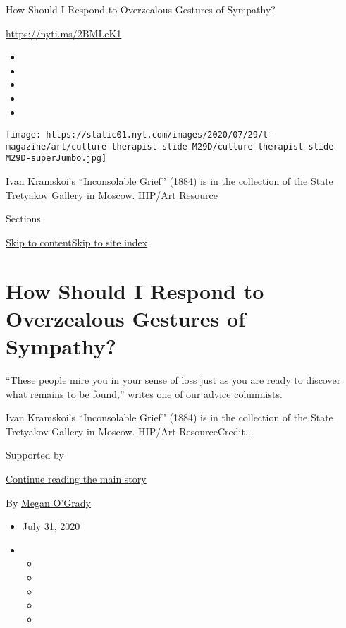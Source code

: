 How Should I Respond to Overzealous Gestures of Sympathy?

\url{https://nyti.ms/2BMLeK1}

\begin{itemize}
\item
\item
\item
\item
\item
\end{itemize}

\texttt{[image: https://static01.nyt.com/images/2020/07/29/t-magazine/art/culture-therapist-slide-M29D/culture-therapist-slide-M29D-superJumbo.jpg]}

Ivan Kramskoi's ``Inconsolable Grief'' (1884) is in the collection of
the State Tretyakov Gallery in Moscow. HIP/Art Resource

Sections

\protect\hyperlink{site-content}{Skip to
content}\protect\hyperlink{site-index}{Skip to site index}

\hypertarget{how-should-i-respond-to-overzealous-gestures-of-sympathy}{%
\section{How Should I Respond to Overzealous Gestures of
Sympathy?}\label{how-should-i-respond-to-overzealous-gestures-of-sympathy}}

``These people mire you in your sense of loss just as you are ready to
discover what remains to be found,'' writes one of our advice
columnists.

Ivan Kramskoi's ``Inconsolable Grief'' (1884) is in the collection of
the State Tretyakov Gallery in Moscow. HIP/Art ResourceCredit...

Supported by

\protect\hyperlink{after-sponsor}{Continue reading the main story}

By \href{https://www.nytimes.com/by/megan-o-grady}{Megan O'Grady}

\begin{itemize}
\item
  July 31, 2020
\item
  \begin{itemize}
  \item
  \item
  \item
  \item
  \item
  \end{itemize}
\end{itemize}


